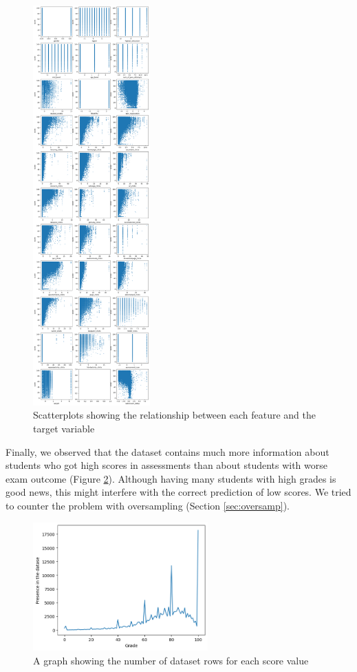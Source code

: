\documentclass{article}
\begin{document}
\begin{figure}
\centering
\includegraphics[width=0.4\textwidth]{scatterplots.png}
\caption{\label{fig:scatt}Scatterplots showing the relationship between each feature and the target variable}
\end{figure}

Finally, we observed that the dataset contains much more information about students who got high scores in assessments than about students with worse exam outcome (Figure \ref{fig:misrepr}). Although having many students with high grades is good news, this might interfere with the correct prediction of low scores. We tried to counter the problem with oversampling (Section \ref{sec:oversamp}).

\begin{figure}
\centering
\includegraphics[width=0.6\textwidth]{misrepr.png}
\caption{\label{fig:misrepr}A graph showing the number of dataset rows for each score value}
\end{figure}
\end{document}
